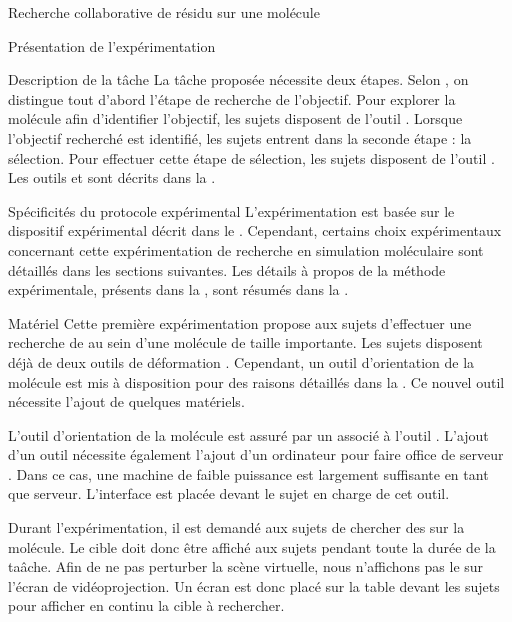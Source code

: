 \documentclass[myfrancais]{mythesis}
\begin{document}
\begin{mychapter}{Recherche collaborative de résidu sur une molécule}
\begin{mysection}{Présentation de l'expérimentation}
\begin{mysubsection}{Description de la tâche}
				La tâche proposée nécessite deux étapes.
				Selon , on distingue tout d'abord l'étape de recherche de l'objectif.
				Pour explorer la molécule afin d'identifier l'objectif, les sujets disposent de l'outil .
				Lorsque l'objectif recherché est identifié, les sujets entrent dans la seconde étape : la sélection.
				Pour effectuer cette étape de sélection, les sujets disposent de l'outil .
				Les outils  et  sont décrits dans la .
			\end{mysubsection}
			\begin{mysubsection}{Spécificités du protocole expérimental}
				L'expérimentation est basée sur le dispositif expérimental décrit dans le .
				Cependant, certains choix expérimentaux concernant cette expérimentation de recherche en simulation moléculaire sont détaillés dans les sections suivantes.
				Les détails à propos de la méthode expérimentale, présents dans la , sont résumés dans la .
				\begin{mysubsubsection}[sss-exp1-Materiel]{Matériel}
					Cette première expérimentation propose aux sujets d'effectuer une recherche de  au sein d'une molécule de taille importante.
					Les sujets disposent déjà de deux outils de déformation .
					Cependant, un outil d'orientation de la molécule est mis à disposition pour des raisons détaillés dans la .
					Ce nouvel outil nécessite l'ajout de quelques matériels.

					L'outil d'orientation de la molécule est assuré par un \myOmni associé à l'outil  .
					L'ajout d'un outil nécessite également l'ajout d'un ordinateur pour faire office de serveur .
					Dans ce cas, une machine de faible puissance est largement suffisante en tant que serveur.
					L'interface est placée devant le sujet en charge de cet outil.

					Durant l'expérimentation, il est demandé aux sujets de chercher des  sur la molécule.
					Le  cible doit donc être affiché aux sujets pendant toute la durée de la taâche.
					Afin de ne pas perturber la scène virtuelle, nous n'affichons pas le  sur l'écran de vidéoprojection.
					Un écran \myLCD {} est donc placé sur la table devant les sujets pour afficher en continu la cible à rechercher.


\end{mysubsubsection}
\end{mysubsection}
\end{mysection}
\end{mychapter}
\end{document}
